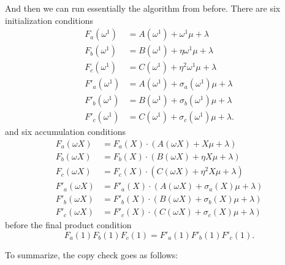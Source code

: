 And then we can run essentially the algorithm from before. There are six
initialization conditions
\begin{equation}
\label{copycheck-init}
\begin{aligned}
F_{a}( \omega^{1} ) & = A( \omega^{1} ) + \omega^{1}\mu + \lambda \\
F_{b}( \omega^{1} ) & = B( \omega^{1} ) + \eta\omega^{1}\mu + \lambda \\
F_{c}( \omega^{1} ) & = C( \omega^{1} ) + \eta^{2}\omega^{1}\mu + \lambda \\
F'_{a}( \omega^{1} ) & = A( \omega^{1} ) + \sigma_{a}( \omega^{1} )\mu + \lambda \\
F'_{b}( \omega^{1} ) & = B( \omega^{1} ) + \sigma_{b}( \omega^{1} )\mu + \lambda \\
F'_{c}( \omega^{1} ) & = C( \omega^{1} ) + \sigma_{c}( \omega^{1} )\mu + \lambda.
\end{aligned}
\end{equation}
and six accumulation conditions
\begin{equation}
\label{copycheck-accum}
\begin{aligned}
F_{a}(\omega X) & = F_{a}(X) \cdot ( A(\omega X) + X\mu + \lambda ) \\
F_{b}(\omega X) & = F_{b}(X) \cdot ( B(\omega X) + \eta X\mu + \lambda ) \\
F_{c}(\omega X) & = F_{c}(X) \cdot ( C(\omega X) + \eta^{2}X\mu + \lambda ) \\
F'_{a}(\omega X) & = F'_{a}(X) \cdot ( A(\omega X) + \sigma_{a}(X)\mu + \lambda ) \\
F'_{b}(\omega X) & = F'_{b}(X) \cdot ( B(\omega X) + \sigma_{b}(X)\mu + \lambda ) \\
F'_{c}(\omega X) & = F'_{c}(X) \cdot ( C(\omega X) + \sigma_{c}(X)\mu + \lambda )
\end{aligned}
\end{equation}
before the final product condition
\begin{equation}
\label{copycheck-final}
F_{a}(1)F_{b}(1)F_{c}(1) = F'_{a}(1)F'_{b}(1)F'_{c}(1).
\end{equation}

To summarize, the copy check goes as follows:

